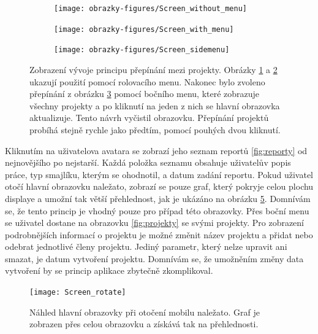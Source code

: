 \begin{figure}[H]
    \centering
    \begin{subfigure}[b]{0.2\textwidth}
        \texttt{[image: obrazky-figures/Screen\_without\_menu]}
        \caption{}
        \label{fig:without_menu}
    \end{subfigure}
    \begin{subfigure}[b]{0.2\textwidth}
        \texttt{[image: obrazky-figures/Screen\_with\_menu]}
        \caption{}
        \label{fig:with_menu}
    \end{subfigure}
    \begin{subfigure}[b]{0.2\textwidth}
        \texttt{[image: obrazky-figures/Screen\_sidemenu]}
        \caption{}
        \label{fig:sidemenu}
    \end{subfigure}
    \caption{Zobrazení vývoje principu přepínání mezi projekty. Obrázky \ref{fig:without_menu} a \ref{fig:with_menu} ukazují použití pomocí rolovacího menu. Nakonec bylo zvoleno přepínání z obrázku \ref{fig:sidemenu} pomocí bočního menu, které zobrazuje všechny projekty a po kliknutí na jeden z nich se hlavní obrazovka aktualizuje. Tento návrh vyčistil obrazovku. Přepínání projektů probíhá stejně rychle jako předtím, pomocí pouhých dvou kliknutí.}
    \label{fig:menus}
\end{figure}

Kliknutím na uživatelova avatara se zobrazí jeho seznam reportů \ref{fig:reporty} od nejnovějšího po nejstarší. Každá položka seznamu obsahuje uživatelův popis práce, typ smajlíku, kterým se ohodnotil, a datum zadání reportu. Pokud uživatel otočí hlavní obrazovku naležato, zobrazí se pouze graf, který pokryje celou plochu displaye a umožní tak větší přehlednost, jak je ukázáno na obrázku \ref{nalezato}. Domnívám se, že tento princip je vhodný pouze pro případ této obrazovky. Přes boční menu se uživatel dostane na obrazovku \ref{fig:projekty} se svými projekty. Pro zobrazení podrobnějších informací o projektu je možné změnit název projektu a přidat nebo odebrat jednotlivé členy projektu. Jediný parametr, který nelze upravit ani smazat, je datum vytvoření projektu. Domnívám se, že umožněním změny data vytvoření by se princip aplikace zbytečně zkomplikoval. 

\begin{figure}[b]
\centering
\texttt{[image: Screen\_rotate]}
\caption{Náhled hlavní obrazovky při otočení mobilu naležato. Graf je zobrazen přes celou obrazovku a získává tak na přehlednosti.}
\label{nalezato}
\end{figure}
 
